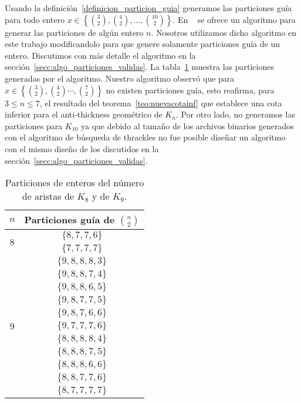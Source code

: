     Usando la definición~\ref{definicion_particion_guia} generamos las particiones guía para todo entero
    $x\in \left\{ \binom{3}{2}, \binom{4}{2}, \dots, \binom{10}{2}\right\}$.
    En ~\cite{Knuth2011} se ofrece un algoritmo para
    generar las particiones de algún entero $n$. Nosotros utilizamos
    dicho algoritmo en este trabajo modificandolo para que genere solamente
    particiones guía de un entero. Discutimos con más detalle el algoritmo en
    la sección~\ref{secc:algo_particiones_validas}.
    La tabla~\ref{tabla:particionesk8k9} muestra las particiones generadas por el
    algoritmo. Nuestro algoritmo observó que para $x\in \left\{\binom{3}{2},\binom{4}{2}
    \cdots,\binom{7}{2}\right\}$ no existen particiones guía, esto reafirma,
    para $ 3\leq n\leq 7$, el resultado del teorema~\ref{teo:nuevacotainf}
    que establece una cota inferior para el anti-thickness geométrico de $K_n$. Por otro lado,
    no generamos las particiones para $K_{10}$ ya que debido al tamaño de los archivos binarios
    generados con el algoritmo de búsqueda de thrackles no fue posible diseñar un algoritmo con el mismo
    diseño de los discutidos en la sección~\ref{secc:algo_particiones_validas}.
    \begin{table}[t]
      \centering
      \begin{tabular}{|c|c|}
        \hline
        $n$                       & Particiones guía de $\displaystyle\binom{n}{2}$ \\ \hline\hline
        \multirow{2}{*}{$ 8 $}    & $\{8,7,7,6\}$ \\ \cline{2-2}
                                  & $\{7,7,7,7\}$ \\ \hline
        \multirow{11}{*}{$ 9 $}   &$\{9,8,8,8,3\}$ \\ \cline{2-2}
                                  &$\{9,8,8,7,4\}$ \\ \cline{2-2}
                                  &$\{9,8,8,6,5\}$ \\ \cline{2-2}
                                  &$\{9,8,7,7,5\}$ \\ \cline{2-2}
                                  &$\{9,8,7,6,6\}$ \\ \cline{2-2}
                                  &$\{9,7,7,7,6\}$ \\ \cline{2-2}
                                  &$\{8,8,8,8,4\}$ \\ \cline{2-2}
                                  &$\{8,8,8,7,5\}$ \\ \cline{2-2}
                                  &$\{8,8,8,6,6\}$ \\ \cline{2-2}
                                  &$\{8,8,7,7,6\}$ \\ \cline{2-2}
                                  &$\{8,7,7,7,7\}$ \\ \hline
      \end{tabular}
      \caption{Particiones de enteros del número de aristas de $K_8$ y de $K_9$. }
      \label{tabla:particionesk8k9}
    \end{table}

